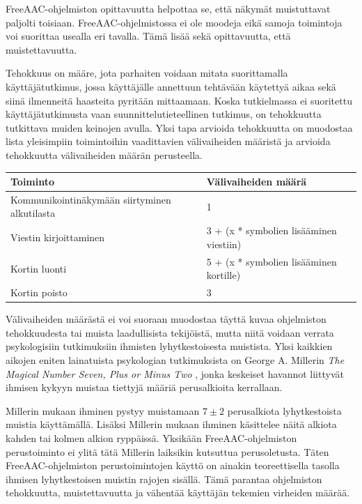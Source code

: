 \documentclass[utf8]{gradu3}
\begin{document}
FreeAAC-ohjelmiston opittavuutta helpottaa se, että näkymät muistuttavat paljolti toisiaan. FreeAAC-ohjelmistossa ei ole moodeja eikä samoja toimintoja voi suorittaa usealla eri tavalla. Tämä lisää sekä opittavuutta, että muistettavuutta. 

Tehokkuus on määre, jota parhaiten voidaan mitata suorittamalla käyttäjätutkimus, jossa käyttäjälle annettuun tehtävään käytettyä aikaa sekä siinä ilmenneitä haasteita pyritään mittaamaan. Koska tutkielmassa ei suoritettu käyttäjätutkimusta vaan suunnittelutieteellinen tutkimus, on tehokkuutta tutkittava muiden keinojen avulla. Yksi tapa arvioida tehokkuutta on muodostaa lista yleisimpiin toimintoihin vaadittavien välivaiheiden määristä ja arvioida tehokkuutta välivaiheiden määrän perusteella.

\begin{center}
    \begin{tabular}{| l | l |}
    \hline
    \textbf{Toiminto} & \textbf{Välivaiheiden määrä} \\ \hline
    Kommunikointinäkymään siirtyminen alkutilasta & 1  \\ \hline
    Viestin kirjoittaminen & 3 + (x * symbolien lisääminen viestiin)\\ \hline
    Kortin luonti & 5 + (x * symbolien lisääminen kortille) \\ \hline
    Kortin poisto & 3  \\ \hline
    \end{tabular}
\end{center}

Välivaiheiden määrästä ei voi suoraan muodostaa täyttä kuvaa ohjelmiston tehokkuudesta tai muista laadullisista tekijöistä, mutta niitä voidaan verrata psykologisiin tutkimuksiin ihmisten lyhytkestoisesta muistista. Yksi kaikkien aikojen eniten lainatuista psykologian tutkimuksista \parencite[]{most-quoted-psych} on George A. Millerin \textit{The Magical Number Seven, Plus or Minus Two} \parencite[]{magical-number-seven}, jonka keskeiset havannot liittyvät ihmisen kykyyn muistaa tiettyjä määriä perusalkioita kerrallaan.

Millerin mukaan ihminen pystyy muistamaan $7 \pm 2$ perusalkiota lyhytkestoista muistia käyttämällä. Lisäksi Millerin mukaan ihminen käsittelee näitä alkiota kahden tai kolmen alkion ryppäissä. Yksikään FreeAAC-ohjelmiston perustoiminto ei ylitä tätä Millerin laiksikin kutsuttua perusoletusta. Täten FreeAAC-ohjelmiston perustoimintojen käyttö on ainakin teoreettisella tasolla ihmisen lyhytkestoisen muistin rajojen sisällä. Tämä parantaa ohjelmiston tehokkuutta, muistettavuutta ja vähentää käyttäjän tekemien virheiden määrää.
\end{document}
